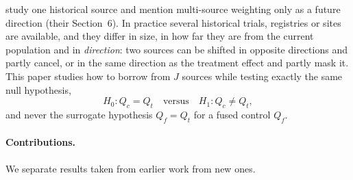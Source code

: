 \documentclass[11pt,a4paper]{article}
\begin{document}
\citet{yang2026} study one historical source and mention multi-source weighting only as a future direction (their Section~6). In practice several historical trials, registries or sites are available, and they differ in size, in how far they are from the current population and in \emph{direction}: two sources can be shifted in opposite directions and partly cancel, or in the same direction as the treatment effect and partly mask it. This paper studies how to borrow from $J$ sources while testing exactly the same null hypothesis,
\[
H_0: Q_c=Q_t \quad\text{versus}\quad H_1: Q_c\neq Q_t,
\]
and never the surrogate hypothesis $Q_f=Q_t$ for a fused control $Q_f$.

\paragraph{Contributions.} We separate results taken from earlier work from new ones.
\end{document}
